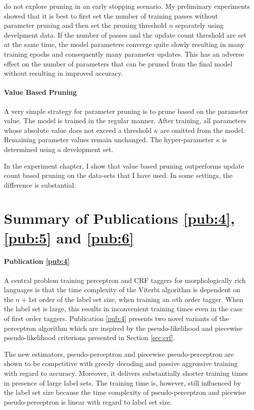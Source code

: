 \cite{Goldberg2011} do not explore pruning in an early stopping
scenario. My preliminary experiments showed that it is best to first
set the number of training passes without parameter pruning and then
set the pruning threshold $n$ separately using develpment data. If the
number of passes and the update count threshold are set at the same
time, the model parameters converge quite slowly resulting in many
training epochs and consequently many parameter updates. This has an
adverse effect on the number of parameters that can be pruned from the
final model without resulting in improved accuracy.

\paragraph{Value Based Pruning} A very simple strategy for
parameter pruning is to prune based on the parameter value. The model
is trained in the regular manner. After training, all parameters whose
absolute value does not exceed a threshold $\kappa$ are omitted from
the model. Remaining parameter values remain unchanged. The
hyper-parameter $\kappa$ is determined using a development set.

In the experiment chapter, I show that value based pruning outperforms
update count based pruning on the data-sets that I have used. In some
settings, the difference is substantial.

\section{Summary of Publications \ref{pub:4}, \ref{pub:5} and \ref{pub:6}}

\paragraph{Publication \ref{pub:4}} A central problem training
perceptron and CRF taggers for morphologically rich languages is that
the time complexity of the Viterbi algorithm is dependent on the
$n+1$st order of the label set size, when training an $n$th order
tagger. When the label set is large, this results in inconvenient
training times even in the case of first order taggers. Publication
\ref{pub:4} presents two novel variants of the perceptron algorithm
which are inspired by the pseudo-likelihood and piecewise
pseudo-likelihood criterions presented in Section \ref{sec:crf}.

The new estimators, pseudo-perceptron and piecewise pseudo-perceptron
are shown to be competitive with greedy decoding and passive
aggressive training with regard to accuracy. Moreover, it delivers
substantially shorter training times in presence of large label
sets. The training time is, however, still influenced by the label set
size because the time complexity of pseudo-perceptron and picewise
pseudo-perceptron is linear with regard to label set size.

